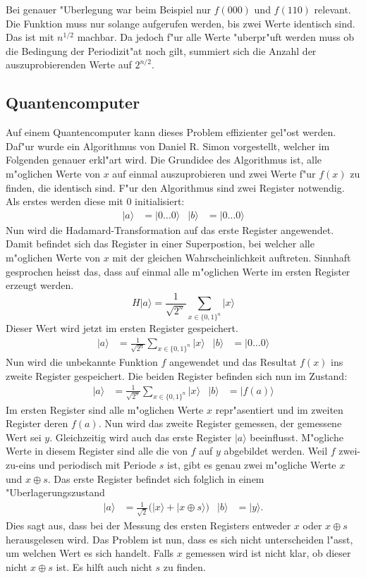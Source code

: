 \begin{refsection}
Bei genauer "Uberlegung war beim Beispiel nur $f(000)$ und $f(110)$ relevant.
Die Funktion muss nur solange aufgerufen werden, bis zwei Werte identisch sind.
Das ist mit $n^{1/2}$ machbar. Da jedoch f"ur alle Werte "uberpr"uft werden muss
ob die Bedingung der Periodizit"at noch gilt, summiert sich die Anzahl der
auszuprobierenden Werte auf $2^{n/2}$.

\subsection{Quantencomputer}

Auf einem Quantencomputer kann dieses Problem effizienter gel"ost werden.
Daf"ur wurde ein Algorithmus von Daniel R. Simon vorgestellt, welcher im
Folgenden genauer erkl"art wird.
Die Grundidee des Algorithmus ist, alle m"oglichen Werte von $x$ auf einmal
auszuprobieren und zwei Werte f"ur $f(x)$ zu finden, die identisch sind.
F"ur den Algorithmus sind zwei Register notwendig. Als erstes werden diese mit
0 initialisiert:
\begin{align*}
  |a\rangle&=|0 \dots 0 \rangle 
  &
  |b\rangle&=|0 \dots 0 \rangle 
\end{align*}
Nun wird die Hadamard-Transformation auf das erste Register angewendet. Damit
befindet sich das Register in einer Superpostion, bei welcher alle m"oglichen
Werte von $x$ mit der gleichen Wahrscheinlichkeit auftreten. Sinnhaft
gesprochen heisst das, dass auf einmal alle m"oglichen Werte im ersten Register
erzeugt werden.
\[ 
    H|a\rangle=\frac{1}{\sqrt{2^n}} \sum_{x\in\{0,1\}^n}{|x\rangle}
\]
Dieser Wert wird jetzt im ersten Register gespeichert.
\begin{align*}
  |a\rangle &= \frac{1}{\sqrt{2^n}} \sum_{x\in\{0,1\}^n} {|x\rangle} &
  |b\rangle&=|0 \dots 0 \rangle 
\end{align*}
Nun wird die unbekannte Funktion $f$ angewendet und das Resultat $f(x)$ ins
zweite Register gespeichert. Die beiden Register befinden sich nun im Zustand:
\begin{align*}
  |a\rangle &= \frac{1}{\sqrt{2^n}} \sum_{x\in\{0,1\}^n} {|x\rangle} &
  |b\rangle &= |f(a)\rangle
\end{align*}
Im ersten Register sind alle m"oglichen Werte $x$ repr"asentiert und im zweiten
Register deren $f(a)$. Nun wird das zweite Register gemessen, der gemessene Wert
sei $y$. 
Gleichzeitig wird auch das erste Register $|a\rangle$ beeinflusst.
M"ogliche Werte in diesem Register sind alle die von $f$ auf $y$ abgebildet
werden. Weil $f$ zwei-zu-eins und periodisch mit Periode $s$ ist, gibt es genau zwei
m"ogliche Werte $x$ und $x \oplus s$. Das erste Register befindet sich folglich
in einem "Uberlagerungszustand
\begin{align*}
  |a\rangle &= \frac{1}{\sqrt{2}} \bigl( |x\rangle + |x \oplus s \rangle \bigr)
  &
  |b\rangle &= |y\rangle.
\end{align*}
Dies sagt aus, dass bei der Messung des ersten Registers entweder $x$ oder $x
\oplus s$ herausgelesen wird. Das Problem ist nun, dass es sich nicht
unterscheiden l"asst, um welchen Wert es sich handelt.
Falls $x$ gemessen wird ist nicht klar, ob dieser nicht $x \oplus s$ ist. 
Es hilft auch nicht $s$ zu finden.


\end{refsection}

